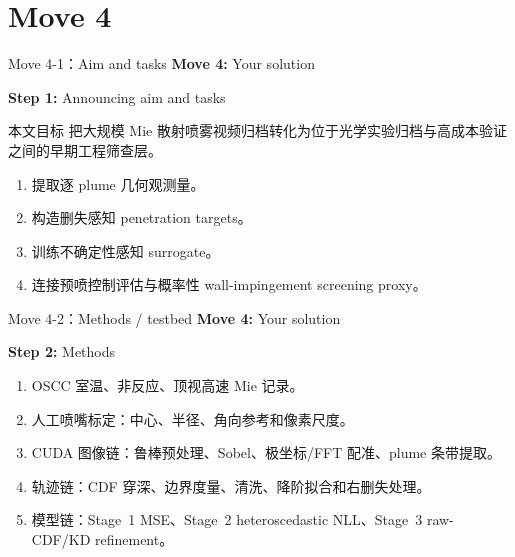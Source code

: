 \documentclass[aspectratio=169,11pt]{beamer}
\newcommand{\movetag}[2]{\textbf{Move #1:} #2}
\newcommand{\steptag}[2]{\textbf{Step #1:} #2}
\begin{document}
\section{Move 4}

\begin{frame}{Move 4-1：Aim and tasks}
\footnotesize
\movetag{4}{Your solution}

\vspace{0.5em}
\steptag{1}{Announcing aim and tasks}

\vspace{0.5em}
\begin{block}{本文目标}
把大规模 Mie 散射喷雾视频归档转化为位于光学实验归档与高成本验证之间的早期工程筛查层。
\end{block}

\vspace{0.3em}
\begin{enumerate}
  \item 提取逐 plume 几何观测量。
  \item 构造删失感知 penetration targets。
  \item 训练不确定性感知 surrogate。
  \item 连接预喷控制评估与概率性 wall-impingement screening proxy。
\end{enumerate}
\end{frame}

\begin{frame}{Move 4-2：Methods / testbed}
\footnotesize
\movetag{4}{Your solution}

\vspace{0.5em}
\steptag{2}{Methods}

\vspace{0.5em}
\begin{enumerate}
  \item OSCC 室温、非反应、顶视高速 Mie 记录。
  \item 人工喷嘴标定：中心、半径、角向参考和像素尺度。
  \item CUDA 图像链：鲁棒预处理、Sobel、极坐标/FFT 配准、plume 条带提取。
  \item 轨迹链：CDF 穿深、边界度量、清洗、降阶拟合和右删失处理。
  \item 模型链：Stage~1 MSE、Stage~2 heteroscedastic NLL、Stage~3 raw-CDF/KD refinement。
\end{enumerate}
\end{frame}
\end{document}
